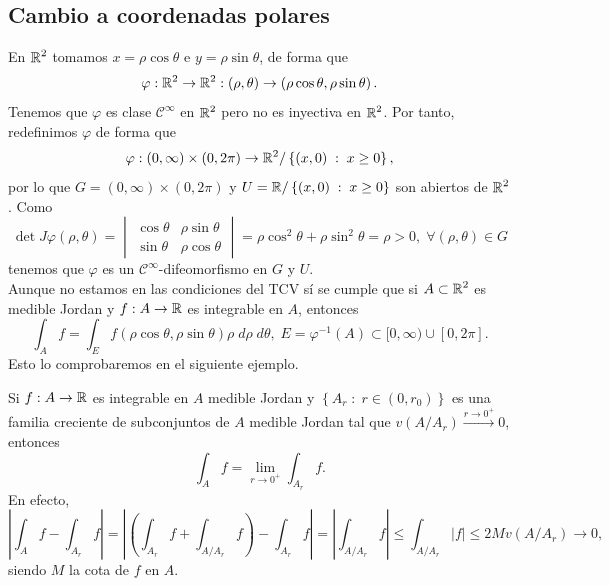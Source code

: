 \subsection{Cambio a coordenadas polares}
En $\displaystyle \mathbb{R}^{2} $ tomamos $\displaystyle x = \rho\cos\theta $ e $\displaystyle y = \rho\sin\theta $, de forma que 
\[\varphi : \mathbb{R}^{2}\to \mathbb{R}^{2} : \left(\rho, \theta\right)\to \left(\rho\cos\theta, \rho\sin\theta\right) .\]
Tenemos que $\displaystyle \varphi $ es clase $\displaystyle \mathcal{C}^{\infty} $ en $\displaystyle \mathbb{R}^{2} $ pero no es inyectiva en $\displaystyle \mathbb{R}^{2} $. Por tanto, redefinimos $\displaystyle \varphi $ de forma que
\[\varphi : \left(0,\infty\right)\times\left(0, 2\pi \right)\to \mathbb{R}^{2} / \left\{ \left(x,0\right) \; : \; x \geq 0\right\}  ,\]
por lo que $\displaystyle G = \left(0,\infty\right)\times \left(0,2\pi \right) $ y $\displaystyle U = \mathbb{R} / \left\{ \left(x,0\right) \; : \; x \geq 0\right\}  $ son abiertos de $\displaystyle \mathbb{R}^{2} $. Como 
\[\det J\varphi\left(\rho, \theta \right)= \begin{vmatrix} \cos\theta & \rho\sin\theta \\ \sin\theta & \rho\cos\theta \end{vmatrix} =\rho\cos^{2}\theta + \rho\sin ^{2}\theta = \rho >0,\; \forall\left(\rho, \theta\right)\in G\]
tenemos que $\displaystyle \varphi $ es un $\displaystyle \mathcal{C}^{\infty} $-difeomorfismo en $\displaystyle G $ y $\displaystyle U $. \\
Aunque no estamos en las condiciones del TCV sí se cumple que si $\displaystyle A \subset \mathbb{R}^{2} $ es medible Jordan y $\displaystyle f : A \to \mathbb{R} $ es integrable en $\displaystyle A $, entonces
\[\int _{A}f =\int _{E}f\left(\rho\cos\theta, \rho\sin\theta\right)\rho \; d\rho\; d\theta, \; E = \varphi^{-1}\left(A\right)\subset[0,\infty)\cup\left[0,2\pi \right]  .\]
Esto lo comprobaremos en el siguiente ejemplo.
\begin{observation}
	Si $\displaystyle f : A \to \mathbb{R} $ es integrable en $\displaystyle A $ medible Jordan y $\displaystyle \left\{ A_{r} \; : \; r \in \left(0, r_{0}\right)\right\}  $ es una familia creciente de subconjuntos de $\displaystyle A $ medible Jordan tal que $\displaystyle v\left(A/A_{r}\right)\xrightarrow{r\to 0^{+}} 0$, entonces
	\[\int _{A}f =\lim_{r \to 0^{+}}\int _{A_{r}}f  .\]
En efecto, 
\[ \left|\int _{A}f -\int _{A_{r}}f \right|= \left|\left(\int _{A_{r}}f +\int _{A/A_{r}}f \right)-\int _{A_{r}}f \right|= \left|\int _{A/A_{r}}f \right|\leq \int _{A/A_{r}} \left|f\right| \leq 2Mv\left(A/A_{r}\right)\to 0 ,\]
siendo $\displaystyle M $ la cota de $\displaystyle f $ en $\displaystyle A $. 
\end{observation}
